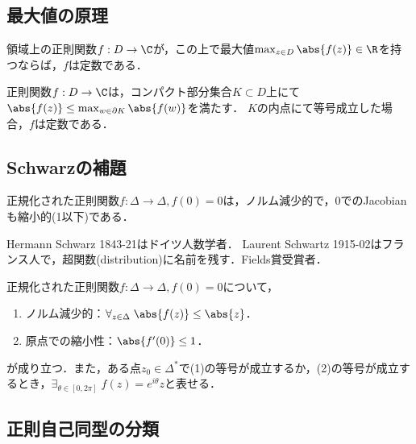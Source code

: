 \documentclass[uplatex, dvipdfmx]{jsreport}
\begin{document}
\subsection{最大値の原理}

\begin{theorem}
    領域上の正則関数$f:D\to\C$が，この上で最大値$\max_{z\in D}\abs{f(z)}\in\R$を持つならば，$f$は定数である．
\end{theorem}

\begin{corollary}
    正則関数$f:D\to\C$は，コンパクト部分集合$K\subset D$上にて$\abs{f(z)}\le\max_{w\in\partial K}\abs{f(w)}$を満たす．
    $K$の内点にて等号成立した場合，$f$は定数である．
\end{corollary}

\subsection{Schwarzの補題}

\begin{tcolorbox}[colframe=ForestGreen, colback=ForestGreen!10!white,breakable,colbacktitle=ForestGreen!40!white,coltitle=black,fonttitle=\bfseries\sffamily,
title=]
    正規化された正則関数$f:\Delta\to\Delta,f(0)=0$は，ノルム減少的で，$0$でのJacobianも縮小的(1以下)である．
\end{tcolorbox}

\begin{history}
    Hermann Schwarz 1843-21はドイツ人数学者．
    Laurent Schwartz 1915-02はフランス人で，超関数(distribution)に名前を残す．Fields賞受賞者．
\end{history}

\begin{theorem}
    正規化された正則関数$f:\Delta\to\Delta,f(0)=0$について，
    \begin{enumerate}
        \item ノルム減少的：$\forall_{z\in\Delta}\;\abs{f(z)}\le\abs{z}$．
        \item 原点での縮小性：$\abs{f'(0)}\le 1$．
    \end{enumerate}
    が成り立つ．また，ある点$z_0\in\Delta^*$で(1)の等号が成立するか，(2)の等号が成立するとき，$\exists_{\theta\in[0,2\pi]}\;f(z)=e^{i\theta}z$と表せる．
\end{theorem}

\subsection{正則自己同型の分類}
\end{document}
